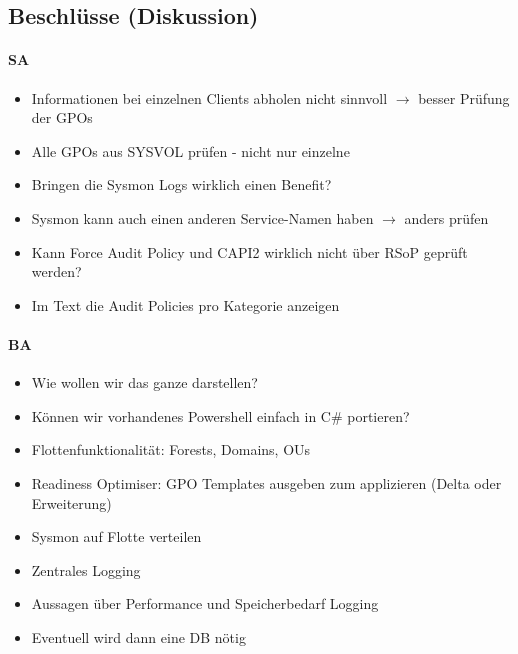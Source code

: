 \vspace{1cm}

\subsection*{Beschlüsse (Diskussion)}
\paragraph{SA}
\begin{itemize}
    \item Informationen bei einzelnen Clients abholen nicht sinnvoll $\rightarrow$ besser Prüfung der GPOs
    \item Alle GPOs aus SYSVOL prüfen - nicht nur einzelne
    \item Bringen die Sysmon Logs wirklich einen Benefit?
    \item Sysmon kann auch einen anderen Service-Namen haben $\rightarrow$ anders prüfen
    \item Kann Force Audit Policy und CAPI2 wirklich nicht über RSoP geprüft werden?
    \item Im Text die Audit Policies pro Kategorie anzeigen
\end{itemize}

\paragraph{BA}
\begin{itemize}
    \item Wie wollen wir das ganze darstellen?
    \item Können wir vorhandenes Powershell einfach in C\# portieren?
    \item Flottenfunktionalität: Forests, Domains, OUs
    \item Readiness Optimiser: GPO Templates ausgeben zum applizieren (Delta oder Erweiterung)
    \item Sysmon auf Flotte verteilen
    \item Zentrales Logging
    \item Aussagen über Performance und Speicherbedarf Logging
    \item Eventuell wird dann eine DB nötig
\end{itemize}

